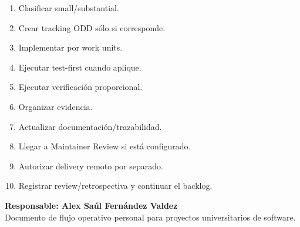 \documentclass[11pt,a4paper]{article}
\newcommand{\responsable}{Alex Saúl Fernández Valdez}
\begin{document}
\begin{enumerate}
    \item[\(\square\)] Clasificar small/substantial.
    \item[\(\square\)] Crear tracking ODD sólo si corresponde.
    \item[\(\square\)] Implementar por work units.
    \item[\(\square\)] Ejecutar test-first cuando aplique.
    \item[\(\square\)] Ejecutar verificación proporcional.
    \item[\(\square\)] Organizar evidencia.
    \item[\(\square\)] Actualizar documentación/trazabilidad.
    \item[\(\square\)] Llegar a Maintainer Review si está configurado.
    \item[\(\square\)] Autorizar delivery remoto por separado.
    \item[\(\square\)] Registrar review/retrospectiva y continuar el backlog.
\end{enumerate}

\vfill

\begin{center}
\small
\textbf{Responsable: \responsable}\\
Documento de flujo operativo personal para proyectos universitarios de software.
\end{center}
\end{document}
